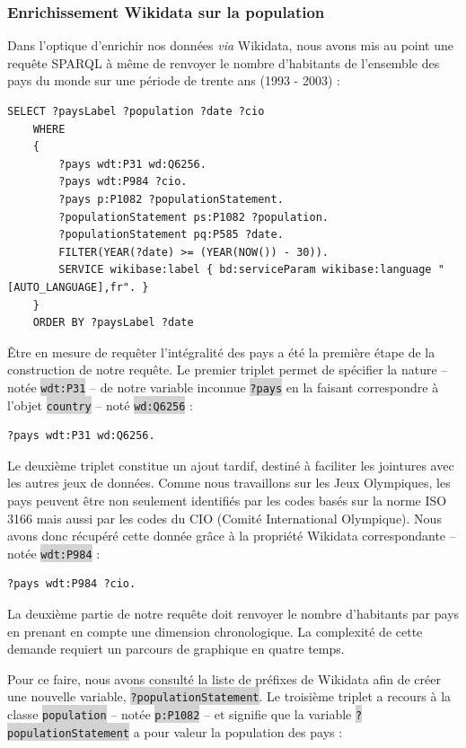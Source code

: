 \documentclass[hidelinks, 12pt]{article}
\newcommand{\code}[1]{\colorbox{LightGray}{\texttt{#1}}}
\begin{document}
\subsubsection{Enrichissement Wikidata sur la population}

Dans l'optique d'enrichir nos données \emph{via} Wikidata, nous avons mis au point une requête SPARQL à même de renvoyer le nombre d'habitants de l'ensemble des pays du monde sur une période de trente ans (1993 - 2003) :
		
\begin{lstlisting}[language=SPARQL]
	SELECT ?paysLabel ?population ?date ?cio
	WHERE 
	{
		?pays wdt:P31 wd:Q6256.
		?pays wdt:P984 ?cio.
		?pays p:P1082 ?populationStatement.
		?populationStatement ps:P1082 ?population. 
		?populationStatement pq:P585 ?date.
		FILTER(YEAR(?date) >= (YEAR(NOW()) - 30)).
		SERVICE wikibase:label { bd:serviceParam wikibase:language "[AUTO_LANGUAGE],fr". }
	}
	ORDER BY ?paysLabel ?date
\end{lstlisting}

Être en mesure de requêter l'intégralité des pays a été la première étape de la construction de notre requête. Le premier triplet permet de spécifier la nature -- notée \code{wdt:P31} -- de notre variable inconnue \code{?pays} en la faisant correspondre à l'objet \code{country} -- noté \code{wd:Q6256} :
		
\begin{lstlisting}[language=SPARQL]
	?pays wdt:P31 wd:Q6256.
\end{lstlisting}

Le deuxième triplet constitue un ajout tardif, destiné à faciliter les jointures avec les autres jeux de données. Comme nous travaillons sur les Jeux Olympiques, les pays peuvent être non seulement identifiés par les codes basés sur la norme ISO 3166 mais aussi par les codes du CIO (Comité International Olympique). Nous avons donc récupéré cette donnée grâce à la propriété Wikidata correspondante -- notée \code{wdt:P984} :

\begin{lstlisting}[language=SPARQL]
	?pays wdt:P984 ?cio.
\end{lstlisting}

La deuxième partie de notre requête doit renvoyer le nombre d'habitants par pays en prenant en compte une dimension chronologique. La complexité de cette demande requiert un parcours de graphique en quatre temps.

Pour ce faire, nous avons consulté la liste de préfixes\autocite{wikiprefixes} de Wikidata afin de créer une nouvelle variable, \code{?populationStatement}. Le troisième triplet a recours à la classe \code{population} -- notée \code{p:P1082} -- et signifie que la variable \code{?populationStatement} a pour valeur la population des pays :
\end{document}
